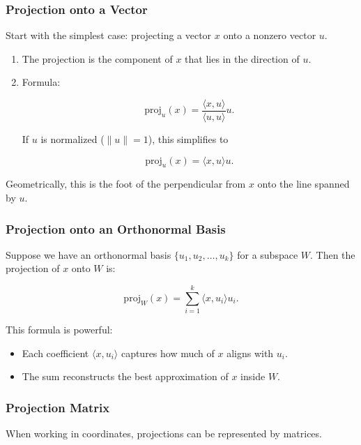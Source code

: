 \documentclass[
  letterpaper,
  DIV=11,
  numbers=noendperiod]{scrreprt}
\providecommand{\tightlist}{%
  \setlength{\itemsep}{0pt}\setlength{\parskip}{0pt}}
\begin{document}
\subsubsection{Projection onto a Vector}\label{projection-onto-a-vector}

Start with the simplest case: projecting a vector \(x\) onto a nonzero
vector \(u\).

\begin{enumerate}
\def\labelenumi{\arabic{enumi}.}
\item
  The projection is the component of \(x\) that lies in the direction of
  \(u\).
\item
  Formula:

  \[
  \text{proj}_u(x) = \frac{\langle x, u \rangle}{\langle u, u \rangle} u.
  \]

  If \(u\) is normalized (\(\|u\|=1\)), this simplifies to

  \[
  \text{proj}_u(x) = \langle x, u \rangle u.
  \]
\end{enumerate}

Geometrically, this is the foot of the perpendicular from \(x\) onto the
line spanned by \(u\).

\subsubsection{Projection onto an Orthonormal
Basis}\label{projection-onto-an-orthonormal-basis}

Suppose we have an orthonormal basis \(\{u_1, u_2, \dots, u_k\}\) for a
subspace \(W\). Then the projection of \(x\) onto \(W\) is:

\[
\text{proj}_W(x) = \sum_{i=1}^k \langle x, u_i \rangle u_i.
\]

This formula is powerful:

\begin{itemize}
\tightlist
\item
  Each coefficient \(\langle x, u_i \rangle\) captures how much of \(x\)
  aligns with \(u_i\).
\item
  The sum reconstructs the best approximation of \(x\) inside \(W\).
\end{itemize}

\subsubsection{Projection Matrix}\label{projection-matrix}

When working in coordinates, projections can be represented by matrices.
\end{document}
